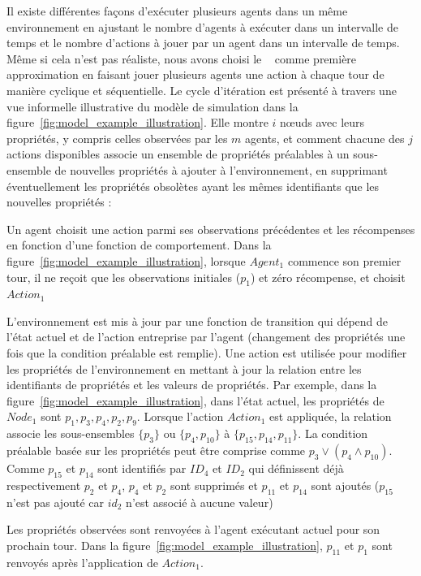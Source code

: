 Il existe différentes façons d'exécuter plusieurs agents dans un même environnement en ajustant le nombre d'agents à exécuter dans un intervalle de temps et le nombre d'actions à jouer par un agent dans un intervalle de temps. Même si cela n'est pas réaliste, nous avons choisi le ~\cite{jk2020} comme première approximation en faisant jouer plusieurs agents une action à chaque tour de manière cyclique et séquentielle. Le cycle d'itération est présenté à travers une vue informelle illustrative du modèle de simulation dans la figure~\ref{fig:model_example_illustration}. Elle montre $i$ nœuds avec leurs propriétés, y compris celles observées par les $m$ agents, et comment chacune des $j$ actions disponibles associe un ensemble de propriétés préalables à un sous-ensemble de nouvelles propriétés à ajouter à l'environnement, en supprimant éventuellement les propriétés obsolètes ayant les mêmes identifiants que les nouvelles propriétés : \begin{enumerate*}[label=\arabic*),itemjoin={;\quad}]
    \item Un agent choisit une action parmi ses observations précédentes et les récompenses en fonction d'une fonction de comportement. Dans la figure~\ref{fig:model_example_illustration}, lorsque $Agent_1$ commence son premier tour, il ne reçoit que les observations initiales ($p_{1}$) et zéro récompense, et choisit $Action_1$



    \item L'environnement est mis à jour par une fonction de transition qui dépend de l'état actuel et de l'action entreprise par l'agent (changement des propriétés une fois que la condition préalable est remplie). Une action est utilisée pour modifier les propriétés de l'environnement en mettant à jour la relation entre les identifiants de propriétés et les valeurs de propriétés.
    Par exemple, dans la figure~\ref{fig:model_example_illustration}, dans l'état actuel, les propriétés de $Node_1$ sont $p_1,p_3,p_4,p_2,p_9$. Lorsque l'action $Action_1$ est appliquée, la relation associe les sous-ensembles $\{p_3\}$ ou $\{p_4, \allowbreak p_{10}\}$ à $\{p_{15}, \allowbreak p_{14}, \allowbreak p_{11}\}$. La condition préalable basée sur les propriétés peut être comprise comme $p_3 \lor (p_4 \land p_{10})$. Comme $p_{15}$ et $p_{14}$ sont identifiés par $ID_4$ et $ID_2$ qui définissent déjà respectivement $p_{2}$ et $p_{4}$, $p_{4}$ et $p_{2}$ sont supprimés et $p_{11}$ et $p_{14}$ sont ajoutés ($p_{15}$ n'est pas ajouté car $id_2$ n'est associé à aucune valeur)



    \item Les propriétés observées sont renvoyées à l'agent exécutant actuel pour son prochain tour. Dans la figure~\ref{fig:model_example_illustration}, $p_{11}$ et $p_1$ sont renvoyés après l'application de $Action_1$.

\end{enumerate*}

